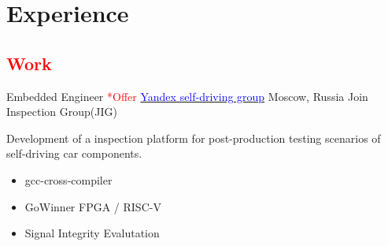 \section{Experience}

\vspace{2mm}
\subsection{\Large{\textcolor{red}{Work}}}


        {Embedded Engineer \textcolor{red}{*Offer}}
        {\href{https://sdg.yandex.com/}{\textcolor{blue}{Yandex self-driving group}}}
        {Moscow, Russia}
        {
        \newline
        Join Inspection Group(JIG) 
        }{Development of a inspection platform for post-production testing scenarios of self-driving car components.
        \begin{itemize}
            \item gcc-cross-compiler
            \item GoWinner FPGA / RISC-V
            \item Signal Integrity Evalutation
        \end{itemize}
        }
        
